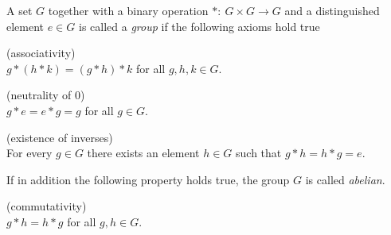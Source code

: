 
 \begin{definition}
  A set $G$ together with a binary operation $* : \: G  \times G \to G$
  and a distinguished element $e \in G$ is called a \emph{group}
  if the following axioms hold true
 \begin{axiomlist}[G]
  \item \textup{\sffamily (associativity)}\\
    $ g * (h *k) = (g*h) *k$ for all $g,h,k \in G$. 
  \item \textup{\sffamily (neutrality of $0$)}\\ 
    $g* e = e*g = g$ for all $g\in G$.
  \item \textup{\sffamily (existence of inverses)}\\ 
    For every $g\in G$ there exists an element $h\in G$ such that
    $g* h = h*g = e$.
  \end{axiomlist}
  If in addition the following property holds true, the group $G$ is called
  \emph{abelian}.
  \begin{axiomlist}[G]
  \setcounter{enumi}{3}
  \item \textup{\sffamily (commutativity)}\\
     $ g*h = h*g$ for all $g,h \in G$. 
  \end{axiomlist} 
 \end{definition}